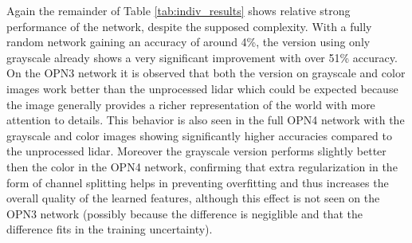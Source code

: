 Again the remainder of Table \ref{tab:indiv_results} shows relative strong performance of the network, despite the supposed complexity. With a fully random network gaining an accuracy of around 4\%, the version using only grayscale already shows a very significant improvement with over 51\% accuracy. On the OPN3 network it is observed that both the version on grayscale and color images work better than the unprocessed lidar which could be expected because the image generally provides a richer representation of the world with more attention to details. This behavior is also seen in the full OPN4 network with the grayscale and color images showing significantly higher accuracies compared to the unprocessed lidar. Moreover the grayscale version performs slightly better then the color in the OPN4 network, confirming that extra regularization in the form of channel splitting helps in preventing overfitting and thus increases the overall quality of the learned features, although this effect is not seen on the OPN3 network (possibly because the difference is negiglible and that the difference fits in the training uncertainty).




